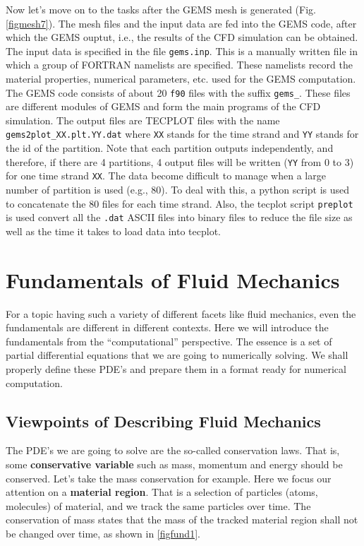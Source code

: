 \documentclass[12pt, letterpaper]{report}
\begin{document}
Now let's move on to the tasks after the GEMS mesh is generated (Fig. \ref{figmesh7}). The mesh
files and the input data are fed into the GEMS code, after which the GEMS ouptut, i.e., the results
of the CFD simulation can be obtained. The input data is specified in the file \verb+gems.inp+. This
is a manually written file in which a group of FORTRAN namelists are specified. These namelists
record the material properties, numerical parameters, etc. used for the GEMS computation. The GEMS
code consists of about 20 \verb+f90+ files with the suffix \verb+gems_+. These files are different
modules of GEMS and form the main programs of the CFD simulation. The output files are TECPLOT files
with the name \verb+gems2plot_XX.plt.YY.dat+ where \verb+XX+ stands for the time strand and
\verb+YY+ stands for the id of the partition. Note that each partition outputs independently, and
therefore, if there are 4 partitions, 4 output files will be written (\verb+YY+ from 0 to 3) for one
time strand \verb+XX+. The data become difficult to manage when a large number of partition is used
(e.g., 80). To deal with this, a python script is used to concatenate the 80 files for each time
strand. Also, the tecplot script \verb+preplot+ is used convert all the \verb+.dat+ ASCII files into
binary files to reduce the file size as well as the time it takes to load data into tecplot.

\chapter{Fundamentals of Fluid Mechanics}\label{c2}

For a topic having such a variety of different facets like fluid mechanics, even the fundamentals
are different in different contexts. Here we will introduce the fundamentals from the
``computational'' perspective. The essence is a set of partial differential equations that we are
going to numerically solving. We shall properly define these PDE's and prepare them in a format ready
for numerical computation. 
\paraspace

\section{Viewpoints of Describing Fluid Mechanics}

The PDE's we are going to solve are the so-called conservation laws. That is, some {\bf conservative
variable} such as mass, momentum and energy should be conserved. Let's take the mass
conservation for example. Here we focus our attention on a {\bf material region}. That is a
selection of particles (atoms, molecules) of material, and we track the same particles over time.
The conservation of mass states that the mass of the tracked material region shall not be changed
over time, as shown in \ref{figfund1}.
\end{document}
